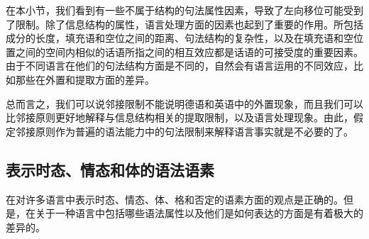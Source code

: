 在本小节，我们看到有一些不属于结构的句法属性因素，导致了左向移位可能受到了限制。除了信息结构的属性，语言处理方面的因素\label{Seite-Subjazenz-Performanz}也起到了重要的作用\citep*{Grosu73a,EC2000a,Gibson98a,KK93a,Hawkins99a,SHS2007a}。所包括成分的长度，填充语和空位之间的距离、句法结构的复杂性，以及在填充语和空位置之间的空间内相似的话语所指之间的相互效应都是话语的可接受度的重要因素。由于不同语言在他们的句法结构方面是不同的，自然会有语言运用的不同效应，比如那些在外置和提取方面的差异。

总而言之，我们可以说邻接限制不能说明德语和英语中的外置现象，而且我们可以比邻接原则更好地解释与信息结构相关的提取限制，以及语言处理现象。由此，假定邻接原则作为普遍的语法能力中的句法限制来解释语言事实就是不必要的了。

\subsection{表示时态、情态和体的语法语素}

\citet[]{Pinker94a}在对许多语言中表示时态、情态、体、格和否定的语素方面的观点是正确的。但是，在关于一种语言中包括哪些语法属性以及他们是如何表达的方面是有着极大的差异的。

